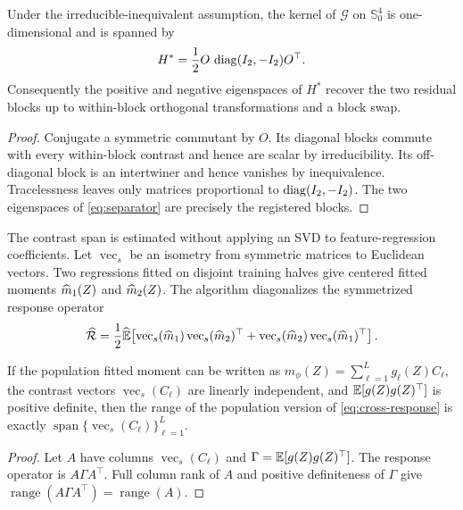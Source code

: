 \begin{theorem}
Under the irreducible-inequivalent assumption, the kernel of $\mathcal G$ on $\mathbb S^4_0$ is one-dimensional and is spanned by
\begin{equation}
 H^*=\frac12 O\,\operatorname{diag}(I_2,-I_2)O^\top.
 \label{eq:separator}
\end{equation}
Consequently the positive and negative eigenspaces of $H^*$ recover the two residual blocks up to within-block orthogonal transformations and a block swap.
\end{theorem}
\begin{proof}
Conjugate a symmetric commutant by $O$.  Its diagonal blocks commute with every within-block contrast and hence are scalar by irreducibility.  Its off-diagonal block is an intertwiner and hence vanishes by inequivalence.  Tracelessness leaves only matrices proportional to $\operatorname{diag}(I_2,-I_2)$.  The two eigenspaces of \eqref{eq:separator} are precisely the registered blocks.
\end{proof}

The contrast span is estimated without applying an SVD to feature-regression coefficients.  Let $\operatorname{vec}_s$ be an isometry from symmetric matrices to Euclidean vectors.  Two regressions fitted on disjoint training halves give centered fitted moments $\widehat m_1(Z)$ and $\widehat m_2(Z)$.  The algorithm diagonalizes the symmetrized response operator
\begin{equation}
 \widehat{\mathcal R}
 =\frac12\widehat{\mathbb E}\!\left[
 \operatorname{vec}_s(\widehat m_1)\operatorname{vec}_s(\widehat m_2)^\top+
 \operatorname{vec}_s(\widehat m_2)\operatorname{vec}_s(\widehat m_1)^\top
 \right].
 \label{eq:cross-response}
\end{equation}

\begin{lemma}
If the population fitted moment can be written as
$m_\phi(Z)=\sum_{\ell=1}^L g_\ell(Z)C_\ell$,
the contrast vectors $\operatorname{vec}_s(C_\ell)$ are linearly independent, and
$\mathbb E[g(Z)g(Z)^\top]$ is positive definite, then the range of the population version of \eqref{eq:cross-response} is exactly
$\operatorname{span}\{\operatorname{vec}_s(C_\ell)\}_{\ell=1}^L$.
\end{lemma}
\begin{proof}
Let $A$ have columns $\operatorname{vec}_s(C_\ell)$ and
$\Gamma=\mathbb E[g(Z)g(Z)^\top]$.  The response operator is
$A\Gamma A^\top$.  Full column rank of $A$ and positive definiteness of $\Gamma$ give
$\operatorname{range}(A\Gamma A^\top)=\operatorname{range}(A)$.
\end{proof}

